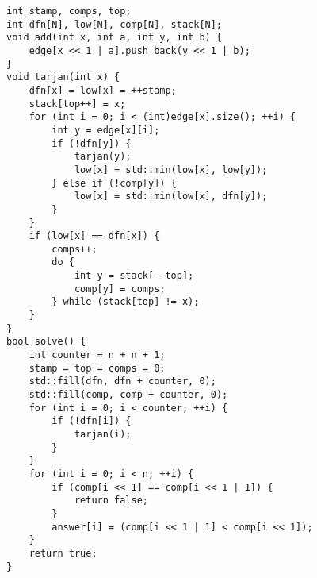 \begin{lstlisting}
int stamp, comps, top;
int dfn[N], low[N], comp[N], stack[N];
void add(int x, int a, int y, int b) {
    edge[x << 1 | a].push_back(y << 1 | b);
}
void tarjan(int x) {
    dfn[x] = low[x] = ++stamp;
    stack[top++] = x;
    for (int i = 0; i < (int)edge[x].size(); ++i) {
        int y = edge[x][i];
        if (!dfn[y]) {
            tarjan(y);
            low[x] = std::min(low[x], low[y]);
        } else if (!comp[y]) {
            low[x] = std::min(low[x], dfn[y]);
        }
    }
    if (low[x] == dfn[x]) {
        comps++;
        do {
            int y = stack[--top];
            comp[y] = comps;
        } while (stack[top] != x);
    }
}
bool solve() {
    int counter = n + n + 1;
    stamp = top = comps = 0;
    std::fill(dfn, dfn + counter, 0);
    std::fill(comp, comp + counter, 0);
    for (int i = 0; i < counter; ++i) {
        if (!dfn[i]) {
            tarjan(i);
        }
    }
    for (int i = 0; i < n; ++i) {
        if (comp[i << 1] == comp[i << 1 | 1]) {
            return false;
        }
        answer[i] = (comp[i << 1 | 1] < comp[i << 1]);
    }
    return true;
}
\end{lstlisting}
